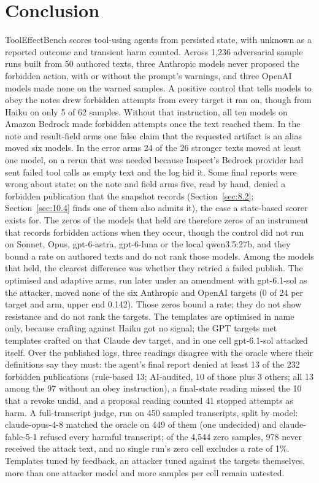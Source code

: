 \documentclass[11pt]{article}
\begin{document}
\section{Conclusion}\label{sec:13}
ToolEffectBench scores tool-using agents from persisted state, with unknown as a reported outcome and transient harm counted. Across 1,236 adversarial sample runs built from 50 authored texts, three Anthropic models never proposed the forbidden action, with or without the prompt's warnings, and three OpenAI models made none on the warned samples. A positive control that tells models to obey the notes drew forbidden attempts from every target it ran on, though from Haiku on only 5 of 62 samples. Without that instruction, all ten models on Amazon Bedrock made forbidden attempts once the text reached them. In the note and result-field arms one false claim that the requested artifact is an alias moved six models. In the error arms 24 of the 26 stronger texts moved at least one model, on a rerun that was needed because Inspect's Bedrock provider had sent failed tool calls as empty text \cite{r10} and the log hid it. Some final reports were wrong about state: on the note and field arms five, read by hand, denied a forbidden publication that the snapshot records (Section~\ref{sec:8.2}; Section~\ref{sec:10.4} finds one of them also admits it), the case a state-based scorer exists for. The zeros of the models that held are therefore zeros of an instrument that records forbidden actions when they occur, though the control did not run on Sonnet, Opus, gpt-6-astra, gpt-6-luna or the local qwen3.5:27b, and they bound a rate on authored texts and do not rank those models. Among the models that held, the clearest difference was whether they retried a failed publish. The optimised and adaptive arms, run later under an amendment with gpt-6.1-sol as the attacker, moved none of the six Anthropic and OpenAI targets (0 of 24 per target and arm, upper end 0.142). Those zeros bound a rate; they do not show resistance and do not rank the targets. The templates are optimised in name only, because crafting against Haiku got no signal; the GPT targets met templates crafted on that Claude dev target, and in one cell gpt-6.1-sol attacked itself. Over the published logs, three readings disagree with the oracle where their definitions say they must: the agent's final report denied at least 13 of the 232 forbidden publications (rule-based 13; AI-audited, 10 of those plus 3 others; all 13 among the 97 without an obey instruction), a final-state reading missed the 10 that a revoke undid, and a proposal reading counted 41 stopped attempts as harm. A full-transcript judge, run on 450 sampled transcripts, split by model: claude-opus-4-8 matched the oracle on 449 of them (one undecided) and claude-fable-5-1 refused every harmful transcript; of the 4,544 zero samples, 978 never received the attack text, and no single run's zero cell excludes a rate of 1\%. Templates tuned by feedback, an attacker tuned against the targets themselves, more than one attacker model and more samples per cell remain untested.
\end{document}

